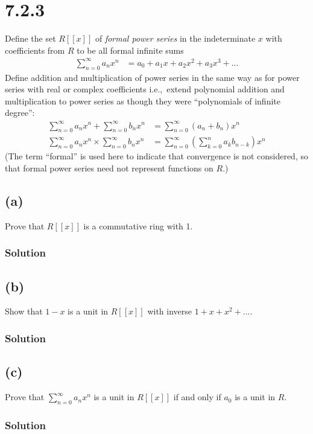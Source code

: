 \documentclass[fleqn]{article}
\begin{document}
    \section{7.2.3}
    Define the set $R[[x]]$ of \textit{formal power series} in the indeterminate $x$ with coefficients from $R$ to be all formal infinite sums
    \begin{align}
        \sum\limits_{n = 0}^{\infty} a_n x^n &= a_0 + a_1 x + a_2 x^2 + a_3 x^3 + ...
    \end{align}
    Define addition and multiplication of power series in the same way as for power series with real or complex coefficients i.e.,\ extend polynomial addition and multiplication to power series as though they were ``polynomials of infinite degree'':
    \begin{align}
        \sum\limits_{n = 0}^{\infty} a_n x^n + \sum\limits_{n = 0}^{\infty} b_n x^n &= \sum\limits_{n = 0}^{\infty} (a_n + b_n) x^n \\
        \sum\limits_{n = 0}^{\infty} a_n x^n \times \sum\limits_{n = 0}^{\infty} b_n x^n &= \sum\limits_{n = 0}^{\infty} \left(\sum\limits_{k = 0}^{n} a_k b_{n - k}\right) x^n
    \end{align}
    (The term ``formal'' is used here to indicate that convergence is not considered, so that formal power series need not represent functions on $R$.)
        
        \subsection{(a)}
        Prove that $R[[x]]$ is a commutative ring with 1.
            
            \subsubsection{Solution}
            
        
        \subsection{(b)}
        Show that $1 - x$ is a unit in $R[[x]]$ with inverse $1 + x + x^2 + ...$.
            
            \subsubsection{Solution}
            
        
        \subsection{(c)}
        Prove that $\sum\limits_{n = 0}^{\infty} a_n x^n$ is a unit in $R[[x]]$ if and only if $a_0$ is a unit in $R$.
            
            \subsubsection{Solution}
            
    
\end{document}
